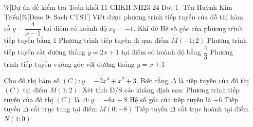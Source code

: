 \begin{ex}%
 \%[Dự án đề kiểm  tra Toán khối 11 GHKII NH23-24-Dot 1- Tên Huỳnh Kim Triển]\%[Deso 9- Sach CTST]
 Viết được phương trình tiếp tuyến của đồ thị hàm số  $y=\dfrac{4}{x-1}$ tại điểm có hoành độ $x_0=-1$. Khi đó
  \choiceTF
  {Hệ số góc của  phương trình tiếp tuyến bằng $1$}
  {Phương trình tiếp tuyến đi  qua điểm $M(-1; 2)$}
  {Phương trình tiếp tuyến cắt đường thẳng $y=2x+1$ tại  điểm có hoành độ bằng $\dfrac{4}{3}$}
  {\True Phương trình tiếp tuyến  vuông góc với đường thẳng $y=x+1$}
\end{ex}

\begin{ex}%
 Cho đồ thị hàm số $(C)\colon y=-2x^4+x^2+3$. Biết rằng $\Delta$ là tiếp tuyến  của đồ thị $(C)$ tại điểm $M(1;2)$. Xét tính Đ/S các khẳng định sau:
 \choiceTF 
  {\True Phương  trình tiếp tuyến của đồ thị $(C)$ là $\Delta\colon y=-6x+8$}
  {\True Hệ  số góc của tiếp tuyến là $-6$}
  {Tiếp tuyến  $\Delta$ cắt trục tung tại điểm $M(0;-8)$}
   {Tiếp tuyến $\Delta$ cắt trục hoành tại điểm $N(1;0)$}
\end{ex}

